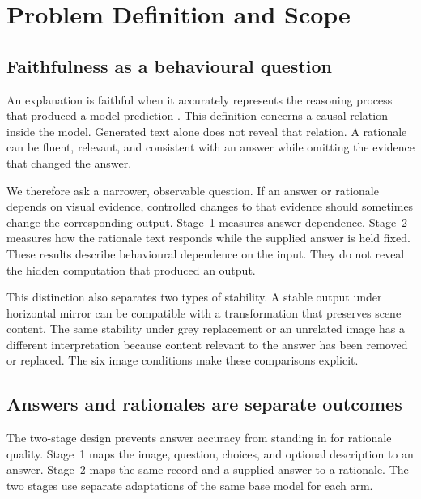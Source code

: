 
\chapter{Problem Definition and Scope}
\label{ch:problem-statement}

\section{Faithfulness as a behavioural question}
\label{sec:problem-definition}

An explanation is faithful when it accurately represents the reasoning process
that produced a model prediction \citep{DBLP:conf/acl/JacoviG20}. This
definition concerns a causal relation inside the model. Generated text alone
does not reveal that relation. A rationale can be fluent, relevant, and
consistent with an answer while omitting the evidence that changed the answer.

We therefore ask a narrower, observable question. If an answer or rationale
depends on visual evidence, controlled changes to that evidence should sometimes
change the corresponding output. Stage~1 measures answer
dependence. Stage~2 measures how the rationale text responds while the supplied
answer is held fixed. These results describe behavioural dependence on the
input. They do not reveal the hidden computation that produced an output.

This distinction also separates two types of stability. A stable output under
horizontal mirror can be compatible with a transformation that preserves scene
content. The same stability under grey replacement or an unrelated image has a
different interpretation because content relevant to the answer has been
removed or replaced. The six image conditions make these comparisons explicit.

\section{Answers and rationales are separate outcomes}
\label{sec:problem-two-stage}

The two-stage design prevents answer accuracy from standing in for rationale
quality. Stage~1 maps the image, question, choices, and optional description to
an answer. Stage~2 maps the same record and a supplied answer to a rationale.
The two stages use separate adaptations of the same base model for each arm.

